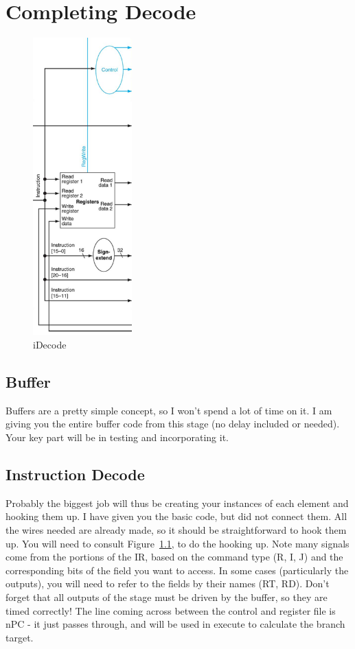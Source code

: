 \chapter{Completing Decode}


\begin{figure}
\caption{iDecode}\label{fig:decode}
\begin{center}
\includegraphics[width=1.5in]{../images/pipeline_decode.png}
\end{center}
\end{figure}

\WrapBarrier

\section{Buffer}

Buffers are a pretty simple concept, so I won't spend a lot of time on it.  I am giving you the entire buffer code from this stage (no delay included or needed).  Your key part will be in testing and incorporating it.

\section{Instruction Decode}


Probably the biggest job will thus be creating your instances of each element and hooking them up.  I have given you the basic code, but did not connect them.  All the wires needed are already made, so it should be straightforward to hook them up.  You will need to consult Figure~\ref{fig:decode}, to do the hooking up.  Note many signals come from the portions of the IR, based on the command type (R, I, J) and the corresponding bits of the field you want to access.  In some cases (particularly the outputs), you will need to refer to the fields by their names (RT, RD).  Don't forget that all outputs of the stage must be driven by the buffer, so they are timed correctly!  The line coming across between the control and register file is nPC - it just passes through, and will be used in execute to calculate the branch target.

